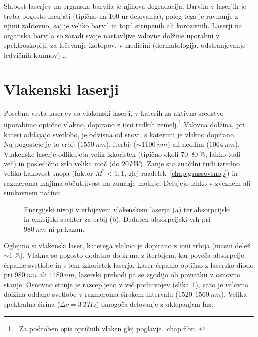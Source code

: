 Slabost laserjev na organska barvila je njihova degradacija. Barvila v
laserjih je treba pogosto menjati (tipično na 100 ur delovanja), poleg tega je ravnanje
z njimi zahtevno, saj je veliko barvil in topil strupenih ali korozivnih.
Laserji na organska barvila so zaradi svoje nastavljive valovne dolžine
uporabni v spektroskopiji, za ločevanje izotopov, v 
medicini (dermatologija, odstranjevanje ledvičnih kamnov) ...
 
\section{Vlakenski laserji}
Posebna vrsta laserjev so vlakenski laserji, v katerih za aktivno 
sredstvo uporabimo optično vlakno, dopirano z ioni redkih zemelj.\footnote{~Za
podroben opis optičnih vlaken glej poglavje~\ref{chap:fibri}.}
Valovna dolžina, pri kateri oddajajo svetlobo, je odvisna od snovi, s katerimi
je vlakno dopirano. Najpogosteje je to erbij ($1550~\si{nm}$),
iterbij ($\sim 1100~\si{nm}$) ali neodim ($1064~\si{nm}$).
Vlakenske laserje odlikujeta
velik izkoristek (tipično okoli $70$--$80~\%$, lahko tudi več) 
in posledično zelo velika moč (do $20~\si{kW}$). Zanje sta značilni tudi
izredno velika kakovost snopa (faktor $M^2<1,1$, glej razdelek~\ref{chap:gaussovsnop}) in 
razmeroma majhna občutljivost na zunanje motnje. Delujejo lahko v zveznem
ali sunkovnem načinu.

\begin{figure}[ht]
\centering
\def\svgwidth{127truemm} 

\caption{Energijski nivoji v erbijevem vlakenskem laserju (a) ter 
absorpcijski in emisijski spekter za erbij (b). Dodaten absorpcijski 
vrh pri $980~\si{nm}$ ni prikazan.}
\label{fig:ErFib}
\end{figure} 

Oglejmo si vlakenski laser, katerega vlakno je dopirano z ioni erbija 
(masni delež $\sim 1~\%$). Vlakna so pogosto dodatno dopirana z iterbijem, kar
poveča absorpcijo črpalne svetlobe in s tem izkoristek laserja. Laser črpamo
optično z lasersko diodo pri $980~\si{nm}$ ali $1480~\si{nm}$, laserski prehodi 
pa se zgodijo ob povratku v osnovno stanje. Osnovno stanje je razcepljeno v več podnivojev
(slika~\ref{fig:ErFib}), zato je valovna dolžina oddane svetlobe v razmeroma 
širokem intervalu ($1520$--$1560~\si{nm}$). Velika spektralna širina
($\Delta \nu = 3~\si{THz}$)
omogoča delovanje z uklepanjem faz. 

